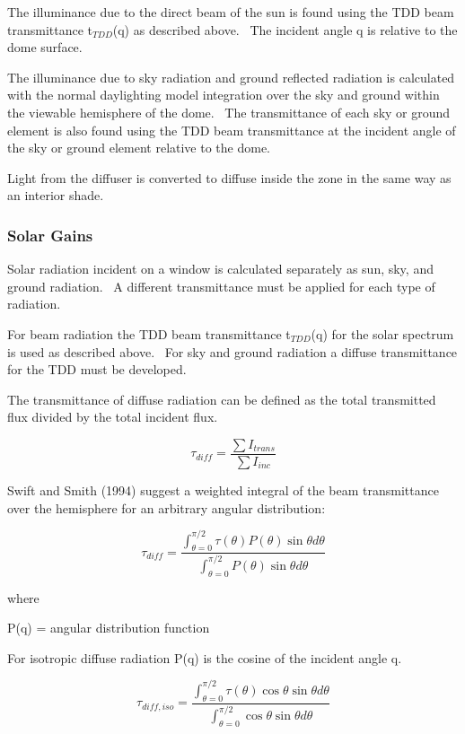 The illuminance due to the direct beam of the sun is found using the TDD beam transmittance t\(_{TDD}\)(q) as described above.~ The incident angle q is relative to the dome surface.

The illuminance due to sky radiation and ground reflected radiation is calculated with the normal daylighting model integration over the sky and ground within the viewable hemisphere of the dome.~ The transmittance of each sky or ground~ element is also found using the TDD beam transmittance at the incident angle of the sky or ground element relative to the dome.

Light from the diffuser is converted to diffuse inside the zone in the same way as an interior shade.

\subsubsection{Solar Gains}\label{solar-gains}

Solar radiation incident on a window is calculated separately as sun, sky, and ground radiation.~ A different transmittance must be applied for each type of radiation.

For beam radiation the TDD beam transmittance t\(_{TDD}\)(q) for the solar spectrum is used as described above.~ For sky and ground radiation a diffuse transmittance for the TDD must be developed.

The transmittance of diffuse radiation can be defined as the total transmitted flux divided by the total incident flux.

\begin{equation}
{\tau_{diff}} = \frac{{\sum {{I_{trans}}} }}{{\sum {{I_{inc}}} }}
\end{equation}

Swift and Smith (1994) suggest a weighted integral of the beam transmittance over the hemisphere for an arbitrary angular distribution:

\begin{equation}
{\tau_{diff}} = \frac{{\int_{\theta  = 0}^{\pi /2} {\tau (\theta )P(\theta )} \sin \theta d\theta }}{{\int_{\theta  = 0}^{\pi /2} {P(\theta )} \sin \theta d\theta }}
\end{equation}

where

P(q) = angular distribution function

For isotropic diffuse radiation P(q) is the cosine of the incident angle q.

\begin{equation}
{\tau_{diff,iso}} = \frac{{\int_{\theta  = 0}^{\pi /2} {\tau (\theta )\cos \theta } \sin \theta d\theta }}{{\int_{\theta  = 0}^{\pi /2} {\cos \theta } \sin \theta d\theta }}
\end{equation}

